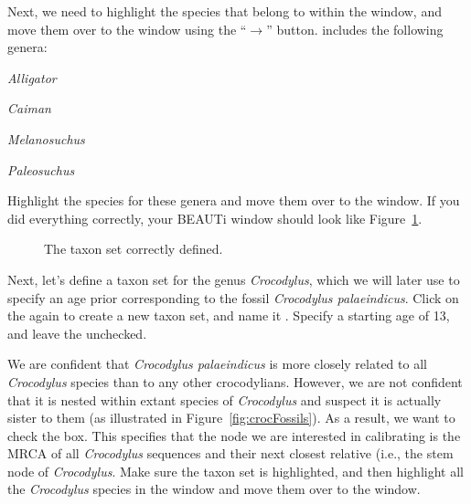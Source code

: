 {    Next, we need to highlight the species that belong to
     within the  window, and move
    them over to the  window using the ``$\to$'' button.
     includes the following genera:
    \begin{compactitem}
        \item \emph{Alligator}
        \item \emph{Caiman}
        \item \emph{Melanosuchus}
        \item \emph{Paleosuchus}
    \end{compactitem}
    Highlight the species for these genera and move them over to the
     window.
    If you did everything correctly, your BEAUTi window should look like
    Figure~\ref{fig:beautiAlligatoridae}.
    \begin{figure}[htbp]
        \centering
        \caption{The taxon set  correctly defined.}
        \label{fig:beautiAlligatoridae}
    \end{figure}

    Next, let's define a taxon set for the genus \emph{Crocodylus}, which
    we will later use to specify an age prior corresponding to the fossil
    \emph{Crocodylus palaeindicus}. Click on the \plusbutton again to
    create a new taxon set, and name it . Specify
    a starting age of 13, and leave the  unchecked.

    We are confident that \emph{Crocodylus palaeindicus} is more closely
    related to all \emph{Crocodylus} species than to any other crocodylians.
    However, we are not confident that it is nested within extant species of
    \emph{Crocodylus} and suspect it is actually sister to them (as illustrated
    in Figure~\ref{fig:crocFossils}). As a result, we want to check the
     box. This specifies that the node we are interested in
    calibrating is the MRCA of all \emph{Crocodylus} sequences and their next
    closest relative (i.e., the stem node of \emph{Crocodylus}.
    Make sure the  taxon set is highlighted, and then
    highlight all the \emph{Crocodylus} species in the 
    window and move them over to the  window.

}
